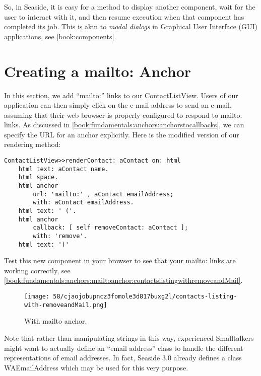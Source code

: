 \documentclass[a4paper,10pt,twoside]{book}
\newcommand{\ct}[1]{{\small\ttfamily\textup{#1}}}
\begin{document}
So, in Seaside, it is easy for a method to display another component, wait for the user to interact with it, and then resume execution when that component has completed its job. This is akin to \textit{modal dialogs} in Graphical User Interface (GUI) applications, see \autoref{book:components}.

\section{Creating a mailto: Anchor}
\label{book:fundamentals:anchors:mailtoanchor}

In this section, we add ``mailto:'' links to our \ct{ContactListView}. Users of our application can then simply click on the e-mail address to send an e-mail, assuming that their web browser is properly configured to respond to \ct{mailto:} links. As discussed in \autoref{book:fundamentals:anchors:anchorstocallbacks}, we can specify the URL for an anchor explicitly. Here is the modified version of our rendering method:

\begin{lstlisting}
ContactListView>>renderContact: aContact on: html
    html text: aContact name.
    html space.
    html anchor
        url: 'mailto:' , aContact emailAddress;
        with: aContact emailAddress.
    html text: ' ('.
    html anchor
        callback: [ self removeContact: aContact ];
        with: 'remove'.
    html text: ')'
\end{lstlisting}

Test this new component in your browser to see that your mailto: links are working correctly, see \autoref{book:fundamentals:anchors:mailtoanchor:contactslistingwithremoveandMail}.

\begin{figure}[h!tbp]
	\begin{center}
		\texttt{[image: 58/cjaojobupncz3fomole3d817buxg2l/contacts-listing-with-removeandMail.png]}
		\caption{With mailto anchor.\label{book:fundamentals:anchors:mailtoanchor:contactslistingwithremoveandMail}}
	\end{center}
\end{figure}


Note that rather than manipulating strings in this way, experienced Smalltalkers might want to actually define an ``email address'' class to handle the different representations of email addresses. In fact, Seaside 3.0 already defines a class WAEmailAddress which may be used for this very purpose.
\end{document}
